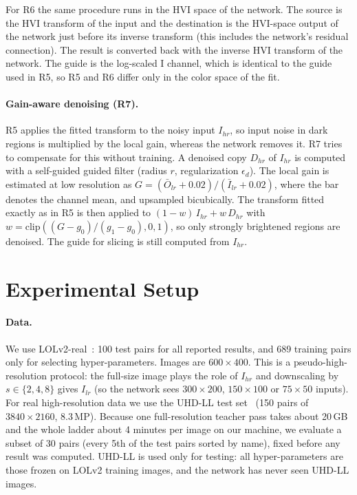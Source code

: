 \documentclass[runningheads]{llncs}
\begin{document}
For R6 the same procedure runs in the HVI space of the network. The source is the HVI transform of the input and the destination is the HVI-space output of the network just before its inverse transform (this includes the network's residual connection). The result is converted back with the inverse HVI transform of the network. The guide is the log-scaled I channel, which is identical to the guide used in R5, so R5 and R6 differ only in the color space of the fit.

\paragraph{Gain-aware denoising (R7).} R5 applies the fitted transform to the noisy input $I_{hr}$, so input noise in dark regions is multiplied by the local gain, whereas the network removes it. R7 tries to compensate for this without training. A denoised copy $D_{hr}$ of $I_{hr}$ is computed with a self-guided guided filter (radius $r$, regularization $\epsilon_d$). The local gain is estimated at low resolution as $G=(\bar O_{lr}+0.02)/(\bar I_{lr}+0.02)$, where the bar denotes the channel mean, and upsampled bicubically. The transform fitted exactly as in R5 is then applied to $(1-w)\,I_{hr}+w\,D_{hr}$ with $w=\mathrm{clip}((G-g_0)/(g_1-g_0),0,1)$, so only strongly brightened regions are denoised. The guide for slicing is still computed from $I_{hr}$.

\section{Experimental Setup}
\paragraph{Data.} We use LOLv2-real~\cite{lolv2}: 100 test pairs for all reported results, and 689 training pairs only for selecting hyper-parameters. Images are $600{\times}400$. This is a pseudo-high-resolution protocol: the full-size image plays the role of $I_{hr}$ and downscaling by $s\in\{2,4,8\}$ gives $I_{lr}$ (so the network sees $300{\times}200$, $150{\times}100$ or $75{\times}50$ inputs). For real high-resolution data we use the UHD-LL test set~\cite{uhdll} (150 pairs of $3840{\times}2160$, 8.3\,MP). Because one full-resolution teacher pass takes about 20\,GB and the whole ladder about 4 minutes per image on our machine, we evaluate a subset of 30 pairs (every 5th of the test pairs sorted by name), fixed before any result was computed. UHD-LL is used only for testing: all hyper-parameters are those frozen on LOLv2 training images, and the network has never seen UHD-LL images.
\end{document}
